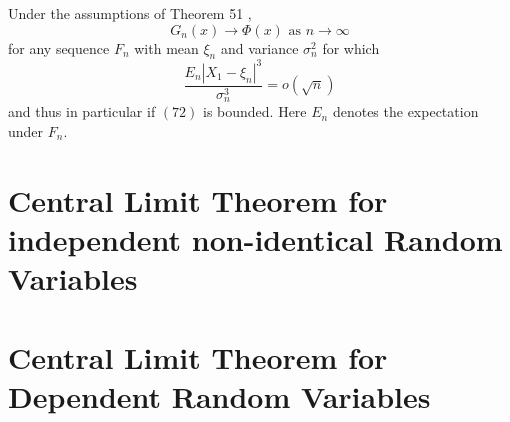 \begin{corollary}
    Under the assumptions of Theorem 51 ,
    $$
        G_{n}(x) \rightarrow \Phi(x) \text { as } n \rightarrow \infty
    $$
    for any sequence $F_{n}$ with mean $\xi_{n}$ and variance $\sigma_{n}^{2}$ for which
    $$
        \frac{E_{n}\left|X_{1}-\xi_{n}\right|^{3}}{\sigma_{n}^{3}}=o(\sqrt{n})
    $$
    and thus in particular if $(72)$ is bounded. Here $E_{n}$ denotes the expectation under $F_{n}$.
\end{corollary}

\section{Central Limit Theorem for independent non-identical Random Variables}

\begin{theorem}

\end{theorem}

\section{Central Limit Theorem for Dependent Random Variables}
